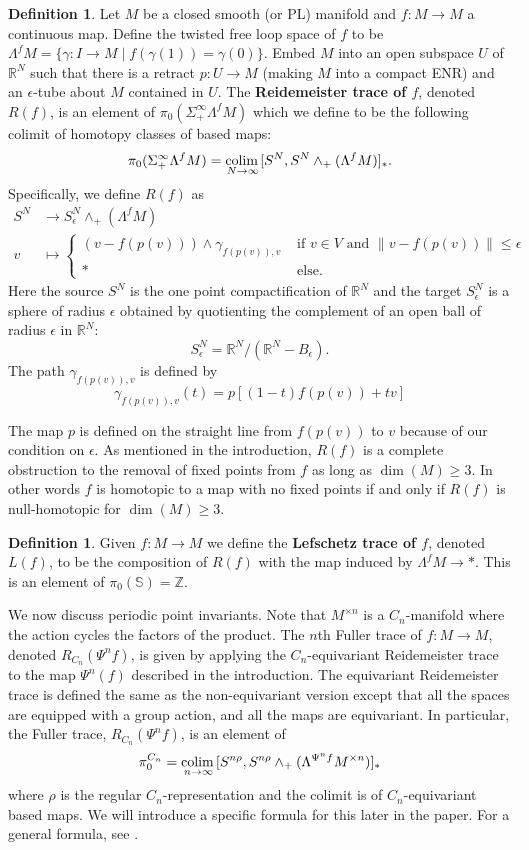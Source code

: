 \documentclass[11pt]{amsart}
\newcommand{\R}{\mathbb R}
\newcommand{\Z}{\mathbb{Z}}
\newcommand{\Sph}{\mathbb{S}}
\newcommand{\colim}{\textup{colim}\,}
\newcommand{\sma}{\wedge}
\theoremstyle{plain}   %
\theoremstyle{definition}
\newtheorem{df}[thm]{Definition}
\theoremstyle{remark}
\numberwithin{equation}{section}
\begin{document}
\begin{df}\label{df:Reidemeister_trace}
Let $M$ be a closed smooth (or PL) manifold and $f:M\to M$ a continuous map. Define the twisted free loop space of $f$ to be $\Lambda^f M = \{\gamma\colon I\to M\mid f(\gamma(1))=\gamma(0)\}$. Embed $M$ into an open subspace $U$ of $\R^N$ such that there is a retract $p:U\to M$ (making $M$ into a compact ENR) and an $\epsilon$-tube about $M$ contained in $U$. The \textbf{Reidemeister trace of $f$}, denoted $R(f)$, is an element of $\pi_0(\Sigma_+^\infty \Lambda^f M)$ which we define to be the following colimit of homotopy classes of based maps:
\[
\pi_0(\Sigma_+^\infty \Lambda^f M)=\underset{N\to \infty}{\colim} [S^N, S^N \sma_+(\Lambda^f M)]_*.
\]
Specifically, we define $R(f)$ as
\begin{align*}
S^N & \to S^N_\epsilon \wedge_+ (\Lambda^f M)\\
v & \mapsto \begin{cases}
(v-f(p(v))) \wedge \gamma_{f(p(v)),v} & \text{ if $v\in V$ and $\|v-f(p(v))\| \leq \epsilon$}\\
* & \text { else}.
\end{cases}
\end{align*}
Here the source $S^N$ is the one point compactification of $\R^N$ and the target $S^N_\epsilon$ is a sphere of radius $\epsilon$ obtained by quotienting the complement of an open ball of radius $\epsilon$ in $\R^N$:
\[
S^N_\epsilon = \R^N / (\R^N - B_\epsilon).
\]
The path $\gamma_{f(p(v)),v}$ is defined by
\[
\gamma_{f(p(v)),v}(t) = p[(1-t)f(p(v)) + tv]
\]
\end{df}

The map $p$ is defined on the straight line from $f(p(v))$ to $v$ because of our condition on $\epsilon$. As mentioned in the introduction, $R(f)$ is a complete obstruction to the removal of fixed points from $f$ as long as $\dim(M)\geq 3$. In other words $f$ is homotopic to a map with no fixed points if and only if $R(f)$ is null-homotopic for $\dim(M)\geq 3$.

\begin{df}
Given $f:M\to M$ we define the \textbf{Lefschetz trace of $f$}, denoted $L(f)$, to be the composition of $R(f)$ with the map induced by $\Lambda^f M \to *$. This is an element of $\pi_0(\Sph) = \Z$.
\end{df} 

We now discuss periodic point invariants. Note that $M^{\times n}$ is a $C_n$-manifold where the action cycles the factors of the product. The $n$th Fuller trace of $f:M\to M$, denoted $R_{C_n}(\Psi^nf)$, is given by applying the $C_n$-equivariant Reidemeister trace to the map $\Psi^n(f)$ described in the introduction. The equivariant Reidemeister trace is defined the same as the non-equivariant version except that all the spaces are equipped with a group action, and all the maps are equivariant. In particular, the  Fuller trace, $R_{C_n}(\Psi^n f)$,  is an element of 
\[
\pi_0^{C_n}=\underset{n\to\infty}{\colim} [S^{n\rho},S^{n\rho}\wedge_+ (\Lambda^{\Psi^nf} M^{\times n})]_*
\]
where $\rho$ is the regular $C_n$-representation and the colimit is of $C_n$-equivariant based maps. We will introduce a specific formula for this later in the paper. For a general formula, see \cite[Section 2]{mp2}. 
\end{document}
